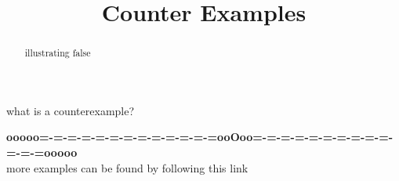 \documentclass{ximera}
\title{Counter Examples}
\begin{document}
\begin{abstract}
illustrating false
\end{abstract}
\maketitle



what is a counterexample?
































\begin{center}
\textbf{\textcolor{green!50!black}{ooooo=-=-=-=-=-=-=-=-=-=-=-=-=ooOoo=-=-=-=-=-=-=-=-=-=-=-=-=ooooo}} \\

more examples can be found by following this link\\ 

\end{center}
\end{document}
